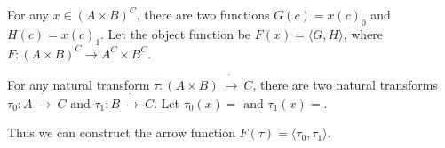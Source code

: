 \documentclass{article}
\begin{document}
For any $x \in (A \times B)^C$, there are two functions $G(c) = x(c)_0$ and $H(c) = x(c)_1$. Let the object function be $F(x) = \langle G, H \rangle$, where $F : (A \times B)^C \rightarrow A^C \times B^C$.

For any natural transform $\tau : (A \times B)\ \dot{\rightarrow}\ C$, there are two natural transforms $\tau_0 : A\ \dot{\rightarrow}\ C$ and $\tau_1 : B\ \dot{\rightarrow}\ C$. Let $\tau_0(x) = $ and $\tau_1(x) = $.

Thus we can construct the arrow function $F(\tau) = \langle \tau_0, \tau_1 \rangle$.

\subsubsection{}

\subsubsection{}

\subsubsection{}

\subsubsection{}

\subsubsection{}

\subsubsection{}

\subsection{}

\subsection{}

\subsection{}

\section{}
\end{document}
